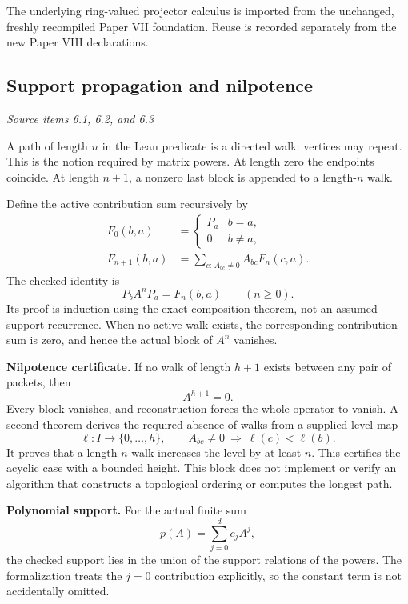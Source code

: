 The underlying ring-valued projector calculus is imported from the unchanged, freshly recompiled Paper VII foundation. Reuse is recorded separately from the new Paper VIII declarations.



\subsection{Support propagation and nilpotence}\label{supp1:subsection:002}\textit{Source items 6.1, 6.2, and 6.3}\par
A path of length $n$ in the Lean predicate  is a directed walk: vertices may repeat. This is the notion required by matrix powers. At length zero the endpoints coincide. At length $n+1$, a nonzero last block is appended to a length-$n$ walk.

Define the active contribution sum recursively by
\begin{align*}
F_0(b,a)&=\begin{cases}P_a&b=a,\\0&b\ne a,\end{cases}\\
F_{n+1}(b,a)&=\sum_{c:\,A_{bc}\ne0}A_{bc}F_n(c,a).
\end{align*}
The checked identity is
\[
\boxed{P_bA^nP_a=F_n(b,a)\qquad(n\ge0).}
\]
Its proof is induction using the exact composition theorem, not an assumed support recurrence. When no active walk exists, the corresponding contribution sum is zero, and hence the actual block of $A^n$ vanishes.

\textbf{Nilpotence certificate.} If no walk of length $h+1$ exists between any pair of packets, then
\[
\boxed{A^{h+1}=0.}
\]
Every block vanishes, and reconstruction forces the whole operator to vanish. A second theorem derives the required absence of walks from a supplied level map
\[
\ell:I\longrightarrow\{0,\ldots,h\},\qquad
A_{bc}\ne0\ \Longrightarrow\ \ell(c)<\ell(b).
\]
It proves that a length-$n$ walk increases the level by at least $n$. This certifies the acyclic case with a bounded height. This block does not implement or verify an algorithm that constructs a topological ordering or computes the longest path.

\textbf{Polynomial support.} For the actual finite sum
\[
p(A)=\sum_{j=0}^{d}c_jA^j,
\]
the checked support lies in the union of the support relations of the powers. The formalization treats the $j=0$ contribution explicitly, so the constant term is not accidentally omitted.

